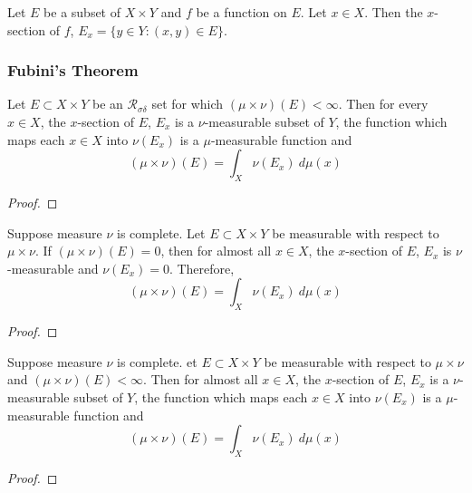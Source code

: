 \begin{definition}[$x$-section]
	Let $E$ be a subset of $X \times Y$ and $f$ be a function on $E$.
	Let $x \in X$.
	Then the $x$-section of $f$, $E_x = \{ y \in Y : (x,y) \in E \}$.
\end{definition}

\subsubsection{Fubini's Theorem}
\begin{lemma}
	Let $E \subset X \times Y$ be an $\mathcal{R}_{\sigma\delta}$ set for which $(\mu \times \nu)(E) < \infty$.
	Then for every $x \in X$, the $x$-section of $E$, $E_x$ is a $\nu$-measurable subset of $Y$, the function which maps each $x \in X$ into $\nu(E_x)$ is a $\mu$-measurable function and
	\begin{equation}
		(\mu \times \nu)(E) = \int_X \nu(E_x) \ d\mu(x)
	\end{equation}
\end{lemma}
\begin{proof}
\end{proof}

\begin{lemma}
	Suppose measure $\nu$ is complete.
	Let $E \subset X \times Y$ be measurable with respect to $\mu \times \nu$.
	If $(\mu \times \nu)(E) = 0$, then for almost all $x \in X$, the $x$-section of $E$, $E_x$ is $\nu$-measurable and $\nu(E_x) = 0$.
	Therefore,
	\begin{equation}
		(\mu \times \nu)(E) = \int_X \nu(E_x) \ d\mu(x)
	\end{equation}
\end{lemma}
\begin{proof}
\end{proof}

\begin{theorem}
	Suppose measure $\nu$ is complete.
	et $E \subset X \times Y$ be measurable with respect to $\mu \times \nu$ and $(\mu \times \nu)(E) < \infty$.
	Then for almost all $x \in X$, the $x$-section of $E$, $E_x$ is a $\nu$-measurable subset of $Y$, the function which maps each $x \in X$ into $\nu(E_x)$ is a $\mu$-measurable function and
	\begin{equation}
		(\mu \times \nu)(E) = \int_X \nu(E_x) \ d\mu(x)
	\end{equation}
\end{theorem}
\begin{proof}
\end{proof}

